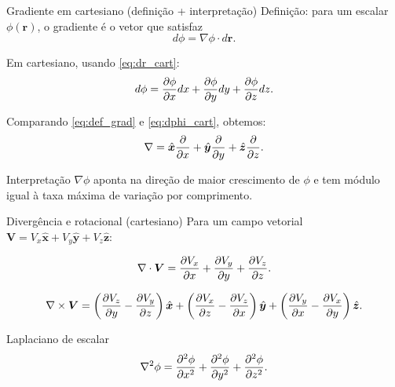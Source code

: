 \documentclass[aspectratio=169]{beamer}
\begin{document}
\begin{frame}{Gradiente em cartesiano (definição + interpretação)}
Definição: para um escalar $\phi(\bm r)$, o gradiente é o vetor que satisfaz
\begin{equation}
d\phi = \nabla\phi\cdot d\bm r.
\label{eq:def_grad}
\end{equation}

Em cartesiano, usando \eqref{eq:dr_cart}:
\begin{equation}
d\phi=\pdv{\phi}{x}dx+\pdv{\phi}{y}dy+\pdv{\phi}{z}dz.
\label{eq:dphi_cart}
\end{equation}

Comparando \eqref{eq:def_grad} e \eqref{eq:dphi_cart}, obtemos:
\begin{equation}
\nabla = \hat{\bm x}\pdv{}{x}+\hat{\bm y}\pdv{}{y}+\hat{\bm z}\pdv{}{z}.
\label{eq:grad_cart}
\end{equation}

\begin{alertblock}{Interpretação}
$\nabla\phi$ aponta na direção de maior crescimento de $\phi$ e tem módulo igual à taxa máxima de variação por comprimento.
\end{alertblock}
\end{frame}

\begin{frame}{Divergência e rotacional (cartesiano)}
Para um campo vetorial $\bm V=V_x\hat{\bm x}+V_y\hat{\bm y}+V_z\hat{\bm z}$:

\begin{equation}
\nabla\cdot\bm V=\pdv{V_x}{x}+\pdv{V_y}{y}+\pdv{V_z}{z}.
\label{eq:div_cart}
\end{equation}

\begin{equation}
\nabla\times\bm V=
\left(\pdv{V_z}{y}-\pdv{V_y}{z}\right)\hat{\bm x}
+\left(\pdv{V_x}{z}-\pdv{V_z}{x}\right)\hat{\bm y}
+\left(\pdv{V_y}{x}-\pdv{V_x}{y}\right)\hat{\bm z}.
\label{eq:curl_cart}
\end{equation}

\begin{block}{Laplaciano de escalar}
\begin{equation}
\nabla^2\phi=\pdv[2]{\phi}{x}+\pdv[2]{\phi}{y}+\pdv[2]{\phi}{z}.
\label{eq:lap_cart}
\end{equation}
\end{block}
\end{frame}
\end{document}
